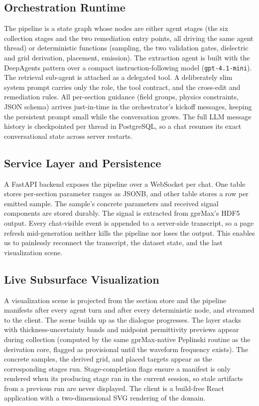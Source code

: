 \documentclass[journal]{IEEEtran}
\begin{document}
\subsection{Orchestration Runtime}

The pipeline is a state graph whose nodes are either agent stages (the six collection stages and the two remediation entry points, all driving the same agent thread) or deterministic functions (sampling, the two validation gates, dielectric and grid derivation, placement, emission). The extraction agent is built with the DeepAgents pattern over a compact instruction-following model (\texttt{gpt-4.1-mini}). The retrieval sub-agent is attached as a delegated tool. A deliberately slim system prompt carries only the role, the tool contract, and the cross-edit and remediation rules. All per-section guidance (field groups, physics constraints, JSON schema) arrives just-in-time in the orchestrator's kickoff messages, keeping the persistent prompt small while the conversation grows. The full LLM message history is checkpointed per thread in PostgreSQL, so a chat resumes its exact conversational state across server restarts.

\subsection{Service Layer and Persistence}

A FastAPI backend exposes the pipeline over a WebSocket per chat. One table stores per-section parameter ranges as JSONB, and other table stores a row per emitted sample. The sample's concrete parameters and received signal components are stored durably. The signal is extracted from gprMax's HDF5 output. Every chat-visible event is appended to a server-side transcript, so a page refresh mid-generation neither kills the pipeline nor loses the output. This enables us to painlessly reconnect the transcript, the dataset state, and the last visualization scene.

\subsection{Live Subsurface Visualization}

A visualization scene is projected from the section store and the pipeline manifests after every agent turn and after every deterministic node, and streamed to the client. The scene builds up as the dialogue progresses. The layer stacks with thickness-uncertainty bands and midpoint permittivity previews appear during collection (computed by the same gprMax-native Peplinski routine as the derivation core, flagged as provisional until the waveform frequency exists). The concrete samples, the derived grid, and placed targets appear as the corresponding stages run. Stage-completion flags ensure a manifest is only rendered when its producing stage ran in the current session, so stale artifacts from a previous run are never displayed. The client is a build-free React application with a two-dimensional SVG rendering of the domain.
\end{document}
